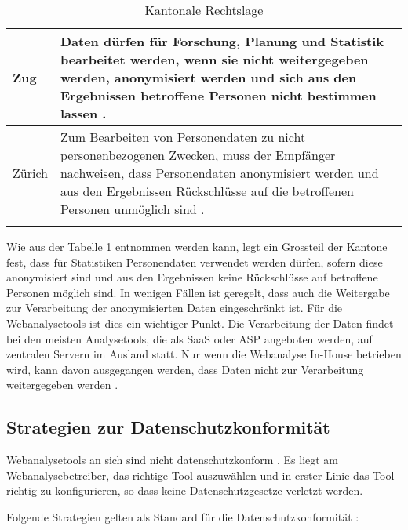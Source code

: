 \begin{longtable}{| p{} | p{}|}
		\hline
    Zug & Daten dürfen für Forschung, Planung und Statistik bearbeitet werden, wenn sie nicht weitergegeben werden, anonymisiert werden und sich aus den Ergebnissen betroffene Personen nicht bestimmen lassen \parencite[§§ 4 Abs 1e]{DSSGZG}. \\
		\hline
    Zürich & Zum Bearbeiten von Personendaten zu nicht personenbezogenen Zwecken, muss der Empfänger nachweisen, dass Personendaten anonymisiert werden und aus den Ergebnissen Rückschlüsse auf die betroffenen Personen unmöglich sind \parencite[§§ 18 Abs. 1-2]{DSSGZH}. \\
		\hline

    \caption{Kantonale Rechtslage}
    \label{tab: ktrechtslage}
	\end{longtable}

  Wie aus der Tabelle \ref{tab: ktrechtslage} entnommen werden kann,
  legt ein Grossteil der Kantone fest, dass für Statistiken Personendaten verwendet werden dürfen, sofern diese anonymisiert sind und aus den Ergebnissen keine Rückschlüsse auf betroffene Personen möglich sind. In wenigen Fällen ist geregelt, dass auch die Weitergabe zur Verarbeitung der anonymisierten Daten eingeschränkt ist. Für die Webanalysetools ist dies ein wichtiger Punkt. Die Verarbeitung der Daten findet bei den meisten Analysetools, die als SaaS oder ASP angeboten werden, auf zentralen Servern im Ausland statt. Nur wenn die Webanalyse In-House betrieben wird, kann davon ausgegangen werden, dass Daten nicht zur Verarbeitung weitergegeben werden \parencite[S. 174-176]{nakatani2011toolselectionmethod}.

  \newpage

\subsection{Strategien zur Datenschutzkonformität}
Webanalysetools an sich sind nicht datenschutzkonform \parencite[S. 1-4]{EcommerceUndDatenschutz}. Es liegt am Webanalysebetreiber, das richtige Tool auszuwählen und in erster Linie das Tool richtig zu konfigurieren, so dass keine Datenschutzgesetze verletzt werden.

Folgende Strategien gelten als Standard für die Datenschutzkonformität \parencite[S. 2-5]{EcommerceUndDatenschutz}:

